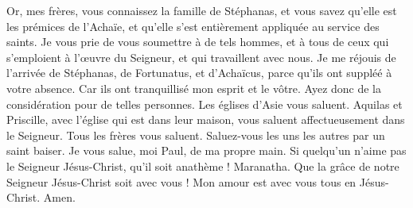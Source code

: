 \begin{multicols}{2}
Or, mes frères, vous connaissez la famille de Stéphanas, et vous savez qu'elle est les prémices de l'Achaïe, et qu’elle s’est entièrement appliquée au service des saints.
Je vous prie de vous soumettre à de tels hommes, et à tous de ceux qui s’emploient à l’œuvre du Seigneur, et qui travaillent avec nous.
Je me réjouis de l’arrivée de Stéphanas, de Fortunatus, et d’Achaïcus, parce qu'ils ont suppléé à votre absence.
Car ils ont tranquillisé mon esprit et le vôtre. Ayez donc de la considération pour de telles personnes.
Les églises d'Asie vous saluent. Aquilas et Priscille, avec l'église qui est dans leur maison, vous saluent affectueusement dans le Seigneur.
Tous les frères vous saluent. Saluez-vous les uns les autres par un saint baiser.
Je vous salue, moi Paul, de ma propre main.
Si quelqu'un n'aime pas le Seigneur Jésus-Christ, qu'il soit anathème ! Maranatha.
Que la grâce de notre Seigneur Jésus-Christ soit avec vous !
Mon amour est avec vous tous en Jésus-Christ. Amen.
\PPE{}
\end{multicols}
